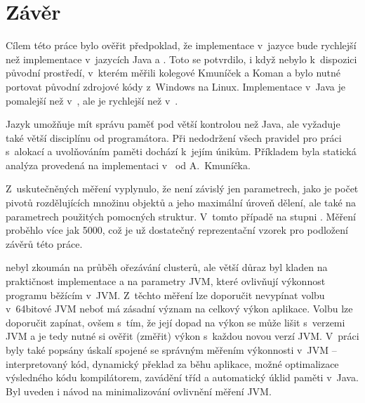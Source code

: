\chapter{Závěr}

Cílem této práce bylo ověřit předpoklad, že implementace  v~jazyce \CC{} bude rychlejší než implementace v~jazycích Java a \CS{}.
Toto se potvrdilo, i když nebylo k~dispozici původní prostředí, v~kterém měřili kolegové Kmuníček a Koman a bylo nutné portovat původní zdrojové kódy \CC{} z~Windows na Linux.
Implementace v~Java je pomalejší než v~\CC, ale je rychlejší než v~\CS{}.

Jazyk \CC{} umožňuje mít správu paměť pod větší kontrolou než Java, ale vyžaduje také větší disciplínu od programátora.
Při nedodržení všech pravidel pro práci s~alokací a uvolňováním paměti dochází k~jejím únikům.
Příkladem byla statická analýza provedená na implementaci v~\CC{} od A.~Kmuníčka.

Z~uskutečněných měření vyplynulo, že \MIndex{} není závislý jen parametrech, jako je počet pivotů rozdělujících množinu objektů a jeho maximální úroveň dělení, ale také na parametrech použitých pomocných struktur.
V~tomto případě na stupni \BPTree.
Měření proběhlo více jak \num{5000}, což je už dostatečný reprezentační vzorek pro podložení závěrů této práce.

\MIndex{} nebyl zkoumán na průběh ořezávání clusterů, ale větší důraz byl kladen na praktičnost implementace a na parametry JVM, které ovlivňují výkonnost programu běžícím v~JVM.
Z~těchto měření lze doporučit nevypínat volbu  v~64bitové JVM neboť má zásadní význam na celkový výkon aplikace.
Volbu  lze doporučit zapínat, ovšem s~tím, že její dopad na výkon se může lišit s~verzemi JVM a je tedy nutné si ověřit (změřit) výkon s~každou novou verzí JVM.
V~práci byly také popsány úskalí spojené se správným měřením výkonnosti v~JVM -- interpretovaný kód, dynamický překlad \bytecode{} za běhu aplikace, možné optimalizace výsledného kódu kompilátorem, zavádění tříd a automatický úklid paměti v~Java.
Byl uveden i návod na minimalizování ovlivnění měření  JVM.

